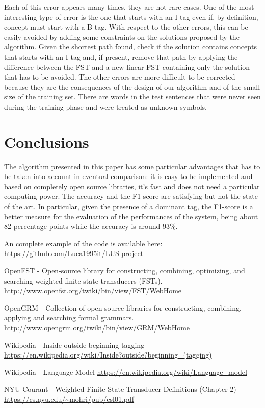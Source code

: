 \documentclass[11pt,a4paper]{article}
\begin{document}
Each of this error appears many times, they are not rare cases. One of the most interesting type of error is the one that starts with an I tag even if, by definition, concept must start with a B tag. With respect to the other errors, this can be easily avoided by adding some constraints on the solutions proposed by the algorithm. Given the shortest path found, check if the solution contains concepts that starts with an I tag and, if present, remove that path by applying the difference between the FST and a new linear FST containing only the solution that has to be avoided.
The other errors are more difficult to be corrected because they are the consequences of the design of our algorithm and of the small size of the training set. There are words in the test sentences that were never seen during the training phase and were treated as unknown symbols.

\section{Conclusions}

The algorithm presented in this paper has some particular advantages that has to be taken into account in eventual comparison: it is easy to be implemented and based on completely open source libraries, it's fast and does not need a particular computing power. The accuracy and the F1-score are satisfying but not the state of the art. In particular, given the presence of a dominant tag, the F1-score is a better measure for the evaluation of the performances of the system, being about 82 percentage points while the accuracy is around 93\%.

An complete example of the code is available here: \url{https://github.com/Luca1995it/LUS-project}

\bigskip


\begin{thebibliography}{2}

OpenFST - Open-source library for constructing, combining, optimizing, and searching weighted finite-state transducers (FSTs). \\
\url{http://www.openfst.org/twiki/bin/view/FST/WebHome}

OpenGRM - Collection of open-source libraries for constructing, combining, applying and searching formal grammars.
\url{http://www.opengrm.org/twiki/bin/view/GRM/WebHome}

Wikipedia - Inside-outside-beginning tagging
\url{https://en.wikipedia.org/wiki/Inside?outside?beginning_(tagging)}

Wikipedia - Language Model
\url{https://en.wikipedia.org/wiki/Language_model}

NYU Courant - Weighted Finite-State Transducer Definitions (Chapter 2)
\url{https://cs.nyu.edu/~mohri/pub/csl01.pdf}


\end{thebibliography}
\end{document}

